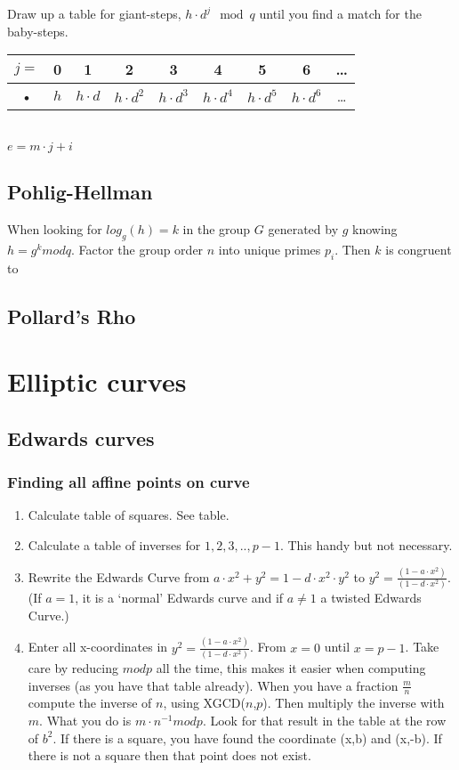 \documentclass{article}
\begin{document}
Draw up a table for giant-steps, $h \cdot d^j \mod q$ until you find a match for the baby-steps.\\
\begin{tabular}{|c|c|c|c|c|c|c|c|c|}
\hline
$j = $ & 0 & 1 & 2 & 3 & 4 & 5 & 6 & \ldots \\
\hline
• & $h$ & $h \cdot d$ & $h \cdot d^2$ & $h \cdot d^3$ & $h \cdot d^4$ & $h \cdot d^5$ & $h \cdot d^6$ & \ldots \\
\hline
\end{tabular} \\
$e = m \cdot j + i$

\subsection{Pohlig-Hellman}
When looking for $log_g(h) = k$ in the group $G$ generated by $g$ knowing $h = g^k mod q$.
Factor the group order $n$ into unique primes $p_i$.
Then $k$ is congruent to 


\subsection{Pollard's Rho}


\section{Elliptic curves}
\subsection{Edwards curves}
\subsubsection{Finding all affine points on curve}

\begin{enumerate}
\item Calculate table of squares. See table.
\item Calculate a table of inverses for $1,2,3,.., p-1$. This handy but not necessary.
\item Rewrite the Edwards Curve from $a \cdot x^2 + y^2 = 1 - d \cdot x^2 \cdot y^2$ to $y^2 = \frac{(1 - a \cdot x^2)}{(1-d \cdot x^2)}$. (If $a=1$, it is a `normal' Edwards curve and if $a\not= 1$ a twisted Edwards Curve.)
\item Enter all x-coordinates in $y^2 = \frac{(1 - a \cdot x^2)}{(1-d \cdot x^2)}$. From $x = 0$ until $x = p-1$. Take care by reducing $mod p$ all the time, this makes it easier when computing inverses (as you have that table already). When you have a fraction $\frac{m}{n}$ compute the inverse of $n$, using XGCD($n$,$p$). Then multiply the inverse with $m$. What you do is $m \cdot n^{-1} mod p$. Look for that result in the table at the row of $b^2$. If there is a square, you have found the coordinate (x,b) and (x,-b). If there is not a square then that point does not exist.

\end{enumerate}
\end{document}
